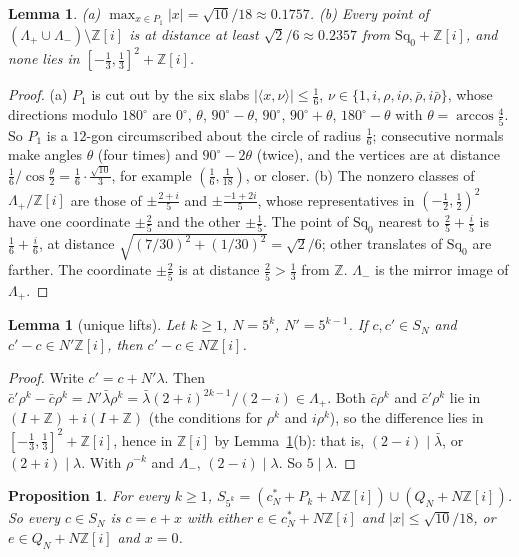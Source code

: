 \documentclass[11pt,a4paper]{amsart}
\newtheorem{proposition}[theorem]{Proposition}
\newtheorem{lemma}[theorem]{Lemma}
\theoremstyle{remark}
\newcommand{\Z}{\mathbb{Z}}
\newcommand{\Sq}{\mathrm{Sq}}
\begin{document}
\begin{lemma}\label{lem:numbers}
\textup{(a)} $\max_{x\in P_1}|x|=\sqrt{10}/18\approx0.1757$.
\textup{(b)} Every point of $(\Lambda_+\cup\Lambda_-)\setminus\Z[i]$ is at distance at least
$\sqrt2/6\approx0.2357$ from $\Sq_0+\Z[i]$, and none lies in $[-\frac13,\frac13]^2+\Z[i]$.
\end{lemma}

\begin{proof}
(a) $P_1$ is cut out by the six slabs $|\langle x,\nu\rangle|\le\frac16$, $\nu\in\{1,i,\rho,i\rho,\bar\rho,i\bar\rho\}$,
whose directions modulo $180^\circ$ are $0^\circ$, $\theta$, $90^\circ-\theta$, $90^\circ$, $90^\circ+\theta$,
$180^\circ-\theta$ with $\theta=\arccos\frac45$. So $P_1$ is a $12$-gon circumscribed about the circle of radius
$\frac16$; consecutive normals make angles $\theta$ (four times) and $90^\circ-2\theta$ (twice), and the vertices
are at distance $\frac16/\cos\frac\theta2=\frac16\cdot\frac{\sqrt{10}}3$, for example $(\frac16,\frac1{18})$, or
closer.
(b) The nonzero classes of $\Lambda_+/\Z[i]$ are those of $\pm\frac{2+i}5$ and $\pm\frac{-1+2i}5$, whose
representatives in $(-\frac12,\frac12)^2$ have one coordinate $\pm\frac25$ and the other $\pm\frac15$. The point of
$\Sq_0$ nearest to $\frac25+\frac i5$ is $\frac16+\frac i6$, at distance $\sqrt{(7/30)^2+(1/30)^2}=\sqrt2/6$; other
translates of $\Sq_0$ are farther. The coordinate $\pm\frac25$ is at distance $\frac25>\frac13$ from $\Z$.
$\Lambda_-$ is the mirror image of $\Lambda_+$.
\end{proof}

\begin{lemma}[unique lifts]\label{lem:lifts}
Let $k\ge1$, $N=5^k$, $N'=5^{k-1}$. If $c,c'\in S_N$ and $c'-c\in N'\Z[i]$, then $c'-c\in N\Z[i]$.
\end{lemma}

\begin{proof}
Write $c'=c+N'\lambda$. Then $\bar c'\rho^k-\bar c\rho^k=N'\bar\lambda\rho^k=\bar\lambda(2+i)^{2k-1}/(2-i)\in\Lambda_+$.
Both $\bar c\rho^k$ and $\bar c'\rho^k$ lie in $(I+\Z)+i(I+\Z)$ (the conditions for $\rho^k$ and $i\rho^k$), so the
difference lies in $[-\frac13,\frac13]^2+\Z[i]$, hence in $\Z[i]$ by Lemma~\ref{lem:numbers}(b): that is,
$(2-i)\mid\bar\lambda$, or $(2+i)\mid\lambda$. With $\rho^{-k}$ and $\Lambda_-$, $(2-i)\mid\lambda$. So $5\mid\lambda$.
\end{proof}

\begin{proposition}\label{prop:shape}
For every $k\ge1$, $S_{5^k}=(c^*_N+P_k+N\Z[i])\cup(Q_N+N\Z[i])$. So every $c\in S_N$ is $c=e+x$ with either
$e\in c^*_N+N\Z[i]$ and $|x|\le\sqrt{10}/18$, or $e\in Q_N+N\Z[i]$ and $x=0$.
\end{proposition}
\end{document}
